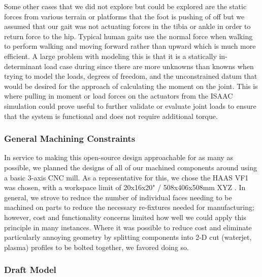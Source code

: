 \documentclass{article}
\begin{document}
Some other cases that we did not explore but could be explored are the static forces from various terrain or platforms that the foot is pushing of off but we assumed that our gait was not actuating forces in the tibia or ankle in order to return force to the hip. Typical human gaits use the normal force when walking to perform walking and moving forward rather than upward which is much more efficient. A large problem with modeling this is that it is a statically in-determinant load case during since there are more unknowns than knowns when trying to model the loads, degrees of freedom, and the unconstrained datum that would be desired for the approach of calculating the moment on the joint. This is where pulling in moment or load forces on the actuators from the ISAAC simulation could prove useful to further validate or evaluate joint loads to ensure that the system is functional and does not require additional torque. 

\subsubsection{General Machining Constraints}

In service to making this open-source design approachable for as many as possible, we planned the designs of all of our machined components around using a basic 3-axis CNC mill. As a representative for this, we chose the HAAS VF1 was chosen, with a workspace limit of 20x16x20" / 508x406x508mm XYZ \cite{haas_vf-1_nodate}. In general, we strove to reduce the number of individual faces needing to be machined on parts to reduce the necessary re-fixtures needed for manufacturing; however, cost and functionality concerns limited how well we could apply this principle in many instances. Where it was possible to reduce cost and eliminate particularly annoying geometry by splitting components into 2-D cut (waterjet, plasma) profiles to be bolted together, we favored doing so.

\subsubsection{Draft Model}
\end{document}
